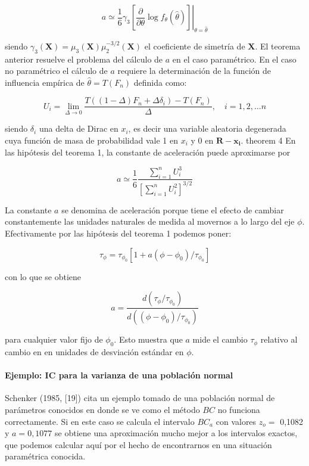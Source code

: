 \documentclass[
]{article}
\begin{document}
\[
\left.a \simeq \frac{1}{6} \gamma_{3}\left[\frac{\partial}{\partial \theta} \log f_{\theta}(\hat{\theta})\right]\right|_{\theta=\hat{\theta}}
\]

siendo \(\gamma_{3}(\mathbf{X})=\mu_{3}(\mathbf{X}) \mu_{2}^{-3 / 2}(\mathbf{X})\) el coeficiente de simetría de \(\mathbf{X}\).
El teorema anterior resuelve el problema del cálculo de \(a\) en el caso paramétrico. En el caso no paramétrico el cálculo de \(a\) requiere la determinación de la función de influencia empírica de \(\hat{\theta}=T\left(F_{n}\right)\) definida como:

\[
U_{i}=\lim _{\Delta \rightarrow 0} \frac{T\left((1-\Delta) F_{n}+\Delta \delta_{i}\right)-T\left(F_{n}\right)}{\Delta}, \quad i=1,2, \ldots n
\]

siendo \(\delta_{i}\) una delta de Dirac en \(x_{i}\), es decir una variable aleatoria degenerada cuya función de masa de probabilidad vale 1 en \(x_{i}\) y 0 en \(\mathbf{R}-\mathbf{x}_{\mathbf{i}}\).
theorem 4 En las hipótesis del teorema 1, la constante de aceleración puede aproximarse por

\[
a \simeq \frac{1}{6} \frac{\sum_{i=1}^{n} U_{i}^{3}}{\left[\sum_{i=1}^{n} U_{i}^{2}\right]^{3 / 2}}
\]

La constante \(a\) se denomina de aceleración porque tiene el efecto de cambiar constantemente las unidades naturales de medida al movernos a lo largo del eje \(\phi\). Efectivamente por las hipótesis del teorema 1 podemos poner:

\[
\tau_{\phi}=\tau_{\phi_{0}}\left[1+a\left(\phi-\phi_{0}\right) / \tau_{\phi_{0}}\right]
\]

con lo que se obtiene

\[
a=\frac{d\left(\tau_{\phi} / \tau_{\phi_{0}}\right)}{d\left(\left(\phi-\phi_{0}\right) / \tau_{\phi_{0}}\right)}
\]

para cualquier valor fijo de \(\phi_{0}\). Esto muestra que \(a\) mide el cambio \(\tau_{\phi}\) relativo al cambio en en unidades de desviación estándar en \(\phi\).

\paragraph{Ejemplo: IC para la varianza de una población normal}\label{ejemplo-ic-para-la-varianza-de-una-poblaciuxf3n-normal}

Schenker (1985, {[}19{]}) cita un ejemplo tomado de una población normal de parámetros conocidos en donde se ve como el método \(B C\) no funciona correctamente. Si en este caso se calcula el intervalo \(B C_{a}\) con valores \(z_{o}=\) 0,1082 y \(a=0,1077\) se obtiene una aproximación mucho mejor a los intervalos exactos, que podemos calcular aquí por el hecho de encontrarnos en una situación paramétrica conocida.
\end{document}
